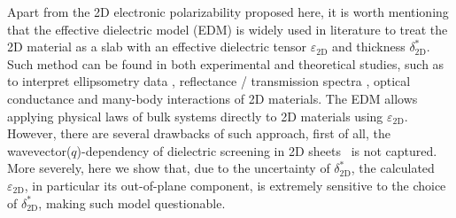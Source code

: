 Apart from the 2D electronic polarizability proposed here, it is worth
mentioning that the effective dielectric model (EDM) is widely used in
literature to treat the 2D material as a slab with an effective
dielectric tensor $\varepsilon_{\mathrm{2D}}$ and thickness
$\delta^{*}_{\mathrm{2D}}$. Such method can be found in both
experimental and theoretical studies, such as to interpret
ellipsometry data
\cite{graphene-epsilon10,Duesberg14,Chiang13,Kong14}, reflectance /
transmission spectra \cite{Li_2014, Yoffe-Wilson69}, optical
conductance \cite{Matthes_2016} and many-body interactions
\cite{Sohier_2016,Meckbach_2018} of 2D materials. The EDM allows
applying physical laws of bulk systems directly to 2D materials using
$\varepsilon_{\mathrm{2D}}$. However, there are several drawbacks of
such approach, first of all, the wavevector($q$)-dependency of
dielectric screening in 2D
sheets~\cite{Cudazzo_2011_screening_2D,Olsen_2016_hydrogen,Trolle_2017_eps_subst}
is not captured. More severely, here we show that, due to the
uncertainty of $\delta^{*}_{\mathrm{2D}}$, the calculated
$\varepsilon_{\mathrm{2D}}$, in particular its out-of-plane component,
is extremely sensitive to the choice of $\delta^{*}_{\mathrm{2D}}$,
making such model questionable.

